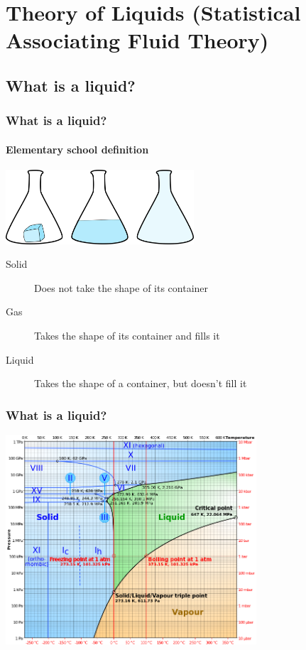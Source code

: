 \section{Theory of Liquids (Statistical Associating Fluid Theory)}
\subsection*{What is a liquid?}
\begin{frame}
  \frametitle{What is a liquid?}
  \framesubtitle{Elementary school definition}
  \begin{center}
    \includegraphics[width=7cm]{figs/solid-liquid-gas}
  \end{center}
  \begin{description}
  \item[Solid] Does not take the shape of its container
  \item[Gas] Takes the shape of its container and fills it
  \item[Liquid] Takes the shape of a container, but doesn't fill it
  \end{description}
\end{frame}

\begin{frame}
  \frametitle{What is a liquid?}
  \begin{center}
    \includegraphics[height=7.8cm]{figs/water-phase-diagram}
  \end{center}
\end{frame}

